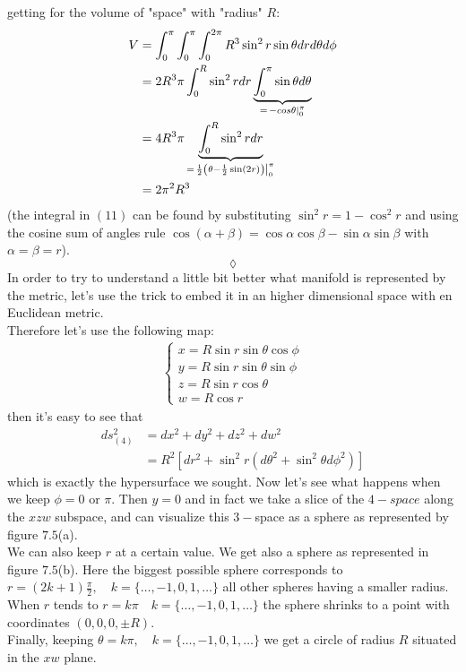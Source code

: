 getting for the volume of "space"  with "radius" $R$:
\begin{align}
V&= \int_{0}^{\pi}\int_{0}^{\pi}\int_{0}^{2\pi}R^3\sin^2 r\sin\theta dr d\theta d\phi\\
&= 2 R^3\pi  \int_{0}^{R}\sin^2 r dr \underbrace{\int_{0}^{\pi}\sin\theta d\theta}_{=\left. -cos\theta\right|_0^{\pi}}\\
&= 4 R^3\pi  \underbrace{\int_{0}^{R}\sin^2 r dr}_{=\left.\frac{1}{2}\left(\theta-\frac{1}{2}\sin (2 r)\right)\right|_0^{\pi}}\\
&=2\pi^2 R^3  
\end{align}
(the integral in $(11)$ can be found by substituting $\sin^2 r = 1-\cos^2 r$ and  using the cosine sum of angles rule $\cos\left(\alpha+\beta\right) = \cos\alpha\cos\beta-\sin\alpha\sin\beta$ with $\alpha = \beta=r$).
$$\lozenge$$
In order to try to understand a little bit better what manifold is represented by the metric, let's use the trick to embed it in an higher dimensional space with en Euclidean metric.\\
Therefore let's use the following map:
\begin{align}
\left\{\begin{array}{l}
x=R\sin r\sin\theta\cos\phi\\
y=R\sin r\sin\theta\sin\phi\\
z=R\sin r\cos\theta\\
w=R\cos r
\end{array}\right.
\end{align}
then it's easy to see that
\begin{align}
ds_{(4)}^2 &=  dx^2+dy^2+dz^2+dw^2\\
&= R^2\left[dr^2+\sin^2 r\left(d\theta^2+\sin^2\theta d\phi^2\right)\right]
\end{align}
which is exactly the hypersurface we sought.
Now let's see what happens when we keep $\phi= 0 \text{ or } \pi$. Then $y=0$ and in fact we take a slice of the $4-space$ along the $xzw$ subspace, and can visualize this $3-$space as a sphere as represented by figure $7.5$(a). \\
We can also keep $r$ at a certain value. We get also a sphere as represented in figure $7.5$(b). Here the biggest possible sphere corresponds to $r=(2k+1)\frac{\pi}{2},\quad k=\{\dots,-1,0,1, \dots\}$ all other spheres having a smaller radius. When $r$ tends to $r=k\pi\quad k=\{\dots,-1,0,1, \dots\}$ the sphere shrinks to a point with coordinates $(0,0,0,\pm R)$.\\
Finally, keeping $\theta =k\pi,\quad k=\{\dots,-1,0,1, \dots\}$ we get a circle of radius $R$ situated in the $xw$ plane.

